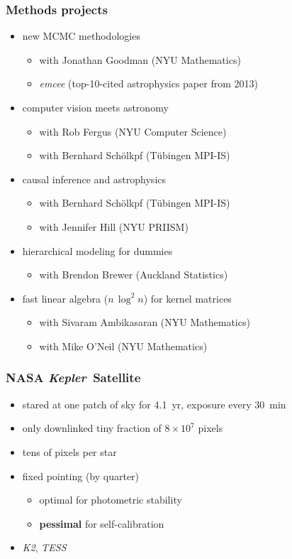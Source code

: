 \documentclass{beamer}
\renewcommand{\emph}[1]{\textbf{#1}}
\newcommand{\project}[1]{\textsl{#1}}
\newcommand{\Kepler}{\project{Kepler}}
\begin{document}
\begin{frame}
  \frametitle{Methods projects}
  \begin{itemize}
  \item new MCMC methodologies
    \begin{itemize}
    \item with Jonathan Goodman (NYU Mathematics)
    \item \project{emcee} (top-10-cited astrophysics paper from 2013)
    \end{itemize}
  \item computer vision meets astronomy
    \begin{itemize}
    \item with Rob Fergus (NYU Computer Science)
    \item with Bernhard Sch\"olkpf (T\"ubingen MPI-IS)
    \end{itemize}
  \item causal inference and astrophysics
    \begin{itemize}
    \item with Bernhard Sch\"olkpf (T\"ubingen MPI-IS)
    \item with Jennifer Hill (NYU PRIISM)
    \end{itemize}
  \item hierarchical modeling for dummies
    \begin{itemize}
    \item with Brendon Brewer (Auckland Statistics)
    \end{itemize}
  \item fast linear algebra ($n\,\log^2n$) for kernel matrices
    \begin{itemize}
    \item with Sivaram Ambikasaran (NYU Mathematics)
    \item with Mike O'Neil (NYU Mathematics)
    \end{itemize}
  \end{itemize}
\end{frame}

\begin{frame}
  \frametitle{NASA \Kepler\ Satellite}
  \begin{itemize}
  \item stared at one patch of sky for 4.1~yr, exposure every 30~min
  \item only downlinked tiny fraction of $8\times 10^7$ pixels
  \item tens of pixels per star
  \item fixed pointing (by quarter)
    \begin{itemize}
    \item optimal for photometric stability
    \item \emph{pessimal} for self-calibration
    \end{itemize}
  \item \project{K2}, \project{TESS}
  \end{itemize}
\end{frame}
\end{document}
